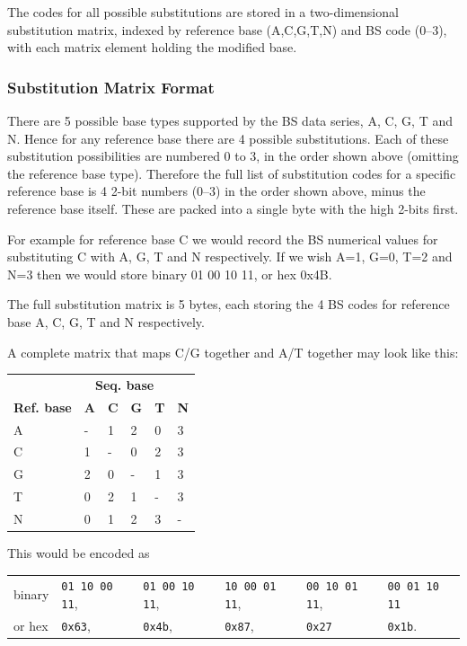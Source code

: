 \documentclass[a4paper]{article}
\begin{document}
The codes for all possible substitutions are stored in a
two-dimensional substitution matrix, indexed by reference base
(A,C,G,T,N) and BS code (0--3), with each matrix element holding the
modified base.

\subsubsection*{Substitution Matrix Format}

There are 5 possible base types supported by the BS data series, A, C,
G, T and N.  Hence for any reference base there are 4 possible
substitutions.  Each of these substitution possibilities are numbered
0 to 3, in the order shown above (omitting the reference base type).
Therefore the full list of substitution codes for a specific reference
base is 4 2-bit numbers (0--3) in the order shown above, minus the
reference base itself.  These are packed into a single byte with the
high 2-bits first.

For example for reference base C we would record the BS numerical
values for substituting C with A, G, T and N respectively.  If we wish
A=1, G=0, T=2 and N=3 then we would store binary 01 00 10 11, or hex 0x4B.

The full substitution matrix is 5 bytes, each storing the 4 BS codes
for reference base A, C, G, T and N respectively.

A complete matrix that maps C/G together and A/T together may look like this:

\begin{tabular}{l|lllll}
& \multicolumn{4}{c}{\textbf{Seq. base}}\\
\textbf{Ref. base} & \textbf{A} & \textbf{C} & \textbf{G} & \textbf{T} & \textbf{N} \\
\hline
A & - & 1 & 2 & 0 & 3 \\
C & 1 & - & 0 & 2 & 3 \\
G & 2 & 0 & - & 1 & 3 \\
T & 0 & 2 & 1 & - & 3 \\
N & 0 & 1 & 2 & 3 & - \\
\end{tabular}

\vskip10pt
This would be encoded as

\begin{tabular}{llllll}
binary & \texttt{01 10 00 11}, & \texttt{01 00 10 11}, & \texttt{10 00 01 11},  & \texttt{00 10 01 11}, & \texttt{00 01 10 11}\\
or hex & \texttt{0x63}, & \texttt{0x4b},& \texttt{0x87}, & \texttt{0x27} &\texttt{0x1b}.\\
\end{tabular}
\end{document}
